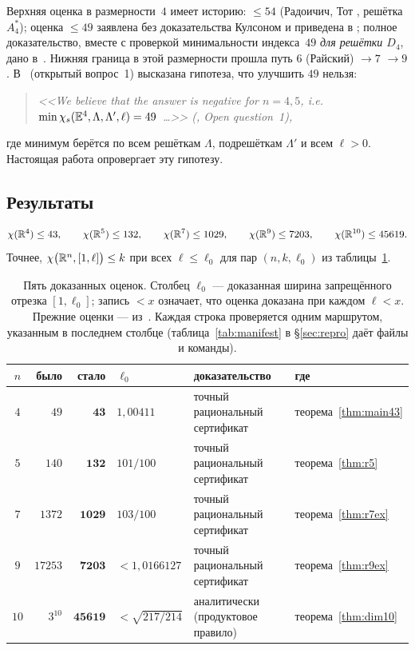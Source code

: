 Верхняя оценка в размерности~$4$ имеет историю: $\le54$ (Радоичич, Тот
\cite{RadoicicToth}, решётка $A_4^*$); оценка $\le49$ заявлена без
доказательства Кулсоном и приведена в \cite{CoulsonPayne2007}; полное
доказательство, вместе с проверкой минимальности индекса~$49$ \emph{для
решётки $D_4$}, дано в~\cite{ABPR}. Нижняя граница в этой размерности прошла
путь $6$ (Райский) $\to7$ \cite{Ivanov2006} $\to9$ \cite{ExooIsmailescu}.
В~\cite{ABPR} (открытый вопрос~1) высказана гипотеза, что улучшить $49$
нельзя:
\begin{quote}\itshape\small
<<We believe that the answer is negative for $n=4,5$, i.e.
$\min\chi_s(\mathbb{E}^4,\Lambda,\Lambda',\ell)=49$~\ldots>> (\cite{ABPR}, Open
question~1),
\end{quote}
где минимум берётся по всем решёткам $\Lambda$, подрешёткам $\Lambda'$ и всем
$\ell>0$. Настоящая работа опровергает эту гипотезу.

\subsection{Результаты}

\begin{keybox}
\begin{theorem}[сводная]\label{thm:summary}
\[
\chi(\mathbb{R}^4)\le43,\qquad \chi(\mathbb{R}^5)\le132,\qquad \chi(\mathbb{R}^7)\le1029,\qquad
\chi(\mathbb{R}^9)\le7203,\qquad \chi(\mathbb{R}^{10})\le45619 .
\]
Точнее, $\chi\bigl(\mathbb{R}^n,[1,\ell]\bigr)\le k$ при всех $\ell\le\ell_0$ для
пар $(n,k,\ell_0)$ из таблицы~\ref{tab:main}.
\end{theorem}
\end{keybox}

\begin{table}[htbp]\centering\small
\caption{Пять доказанных оценок. Столбец $\ell_0$ --- доказанная ширина
запрещённого отрезка $[1,\ell_0]$; запись $<x$ означает, что оценка доказана
при каждом $\ell<x$. Прежние оценки --- из~\cite{ABPR}. Каждая строка
проверяется одним маршрутом, указанным в последнем столбце
(таблица~\ref{tab:manifest} в \S\ref{sec:repro} даёт файлы и команды).}
\label{tab:main}
\begin{tabular}{@{}c r r l l l@{}}
\toprule
$n$ & было & стало & $\ell_0$ & доказательство & где \\
\midrule
$4$  & $49$    & $\mathbf{43}$    & $1{,}00411$      & точный рациональный сертификат & теорема~\ref{thm:main43}\\
$5$  & $140$   & $\mathbf{132}$   & $101/100$        & точный рациональный сертификат & теорема~\ref{thm:r5}\\
$7$  & $1372$  & $\mathbf{1029}$  & $103/100$        & точный рациональный сертификат & теорема~\ref{thm:r7ex}\\
$9$  & $17253$ & $\mathbf{7203}$  & $<1{,}0166127$   & точный рациональный сертификат & теорема~\ref{thm:r9ex}\\
$10$ & $3^{10}$& $\mathbf{45619}$ & $<\sqrt{217/214}$& аналитически (продуктовое правило) & теорема~\ref{thm:dim10}\\
\bottomrule
\end{tabular}
\end{table}

